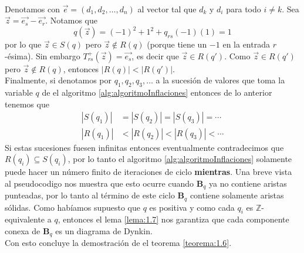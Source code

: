 \paragraph{}
Denotamos con $\overrightarrow{e} = \left(d_{1}, d_{2},\dots,d_{n}\right)$ al vector tal que $d_{k}$ y $d_{i}$ para todo $i \neq k$. Sea $\overrightarrow{z} = \overrightarrow{e_{s}} - \overrightarrow{e_{r}} $. Notamos que 
\begin{equation*}
q\left(\overrightarrow{z}\right) = \left(-1\right)^{2} + 1^{2} + q_{rs}(-1)(1) = 1
\end{equation*}
por lo que $\overrightarrow{z} \in S\left(q\right)$ pero $\overrightarrow{z} \notin R\left(q\right)$ (porque tiene un $-1$ en la entrada $r$-ésima). Sin embargo $T_{rs}^{+}\left(\overrightarrow{z}\right) = \overrightarrow{e_{s}}$, es decir que $\overrightarrow{z} \in R\left(q'\right)$. Como $\overrightarrow{z} \in R\left(q'\right)$ pero $\overrightarrow{z} \notin R\left(q\right)$, entonces $\left|R\left(q\right)\right| < \left|R\left(q'\right)\right|$.\\
Finalmente, si denotamos por $q_{1}, q_{2},q_{3},\ldots$ a la sucesión de valores que toma la variable $q$ de el algoritmo \ref{alg:algoritmoInflaciones} entonces de lo anterior tenemos que\\
\begin{equation*}
\begin{split}
\left|S(q_{1})\right| & = \left|S(q_{2})\right| = \left|S(q_{3})\right| = \cdots\\
\left|R(q_{1})\right| & < \left|R\left(q_{2}\right)\right| < \left|R\left(q_{3}\right)\right| < \cdots 
\end{split}
\end{equation*}
Si estas sucesiones fuesen infinitas entonces eventualmente contradecimos que $R\left(q_{i}\right) \subseteq S\left(q_{i}\right)$, por lo tanto el algoritmo \ref{alg:algoritmoInflaciones} solamente puede hacer un número finito de iteraciones de ciclo \textbf{mientras}. Una breve vista al pseudocodigo nos muestra que esto ocurre cuando $\textbf{B}_{q}$ ya no contiene aristas punteadas, por lo tanto al término de este ciclo $\textbf{B}_{q}$ contiene solamente aristas sólidas. Como habíamos supuesto que $q$ es positiva y como cada $q_{i}$ es $\mathbb{Z}$-equivalente a $q$, entonces el lema \ref{lema:1.7} nos garantiza que cada componente conexa de $\textbf{B}_{q}$ es un diagrama de Dynkin.\\
Con esto concluye la demostración de el teorema \ref{teorema:1.6}.
